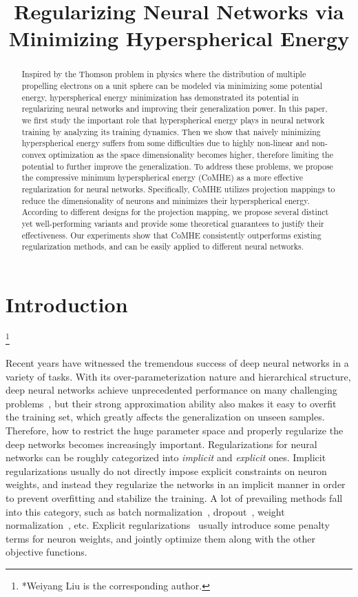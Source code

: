 \title{Regularizing Neural Networks via Minimizing Hyperspherical Energy}

\begin{abstract}
Inspired by the Thomson problem in physics where the distribution of multiple propelling electrons on a unit sphere can be modeled via minimizing some potential energy, hyperspherical energy minimization has demonstrated its potential in regularizing neural networks and improving their generalization power. In this paper, we first study the important role that hyperspherical energy plays in neural network training by analyzing its training dynamics. Then we show that naively minimizing hyperspherical energy suffers from some difficulties due to highly non-linear and non-convex optimization as the space dimensionality becomes higher, therefore limiting the potential to further improve the generalization. To address these problems, we propose the compressive minimum hyperspherical energy (CoMHE) as a more effective regularization for neural networks. Specifically, CoMHE utilizes projection mappings to reduce the dimensionality of neurons and minimizes their hyperspherical energy. According to different designs for the projection mapping, we propose several distinct yet well-performing variants and provide some theoretical guarantees to justify their effectiveness. Our experiments show that CoMHE consistently outperforms existing regularization methods, and can be easily applied to different neural networks.
\end{abstract}

\section{Introduction}\footnote{*Weiyang Liu is the corresponding author.}

Recent years have witnessed the tremendous success of deep neural networks in a variety of tasks. With its over-parameterization nature and hierarchical structure, deep neural networks achieve unprecedented performance on many challenging problems~\cite{he2015deep,girshick2014rich,long2015fully}, but their strong approximation ability also makes it easy to overfit the training set, which greatly affects the generalization on unseen samples. Therefore, how to restrict the huge parameter space and properly regularize the deep networks becomes increasingly important. Regularizations for neural networks can be roughly categorized into \emph{implicit} and \emph{explicit} ones. Implicit regularizations usually do not directly impose explicit constraints on neuron weights, and instead they regularize the networks in an implicit manner in order to prevent overfitting and stabilize the training. A lot of prevailing methods fall into this category, such as batch normalization~\cite{ioffe2015batch}, dropout~\cite{srivastava2014dropout}, weight normalization~\cite{salimans2016weight}, etc. Explicit regularizations~\cite{saxe2013exact,mishkin2016all,bansal2018can,rodriguez2016regularizing,huang2018orthogonal,LiuNIPS18} usually introduce some penalty terms for neuron weights, and jointly optimize them along with the other objective functions.

